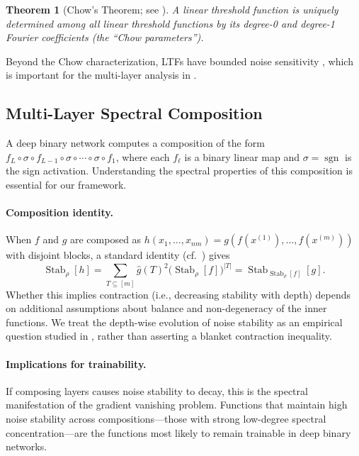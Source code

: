 \documentclass[12pt,a4paper]{article}
\theoremstyle{plain}
\newtheorem{theorem}{Theorem}[section]
\theoremstyle{definition}
\theoremstyle{remark}
\newcommand{\ghat}{\widehat{g}}
\newcommand{\sgn}{\operatorname{sgn}}
\newcommand{\Stab}{\operatorname{Stab}}
\begin{document}
\begin{theorem}[Chow's Theorem; see {\citet[Chapter~5]{odonnell2014analysis}}]\label{thm:chow}
A linear threshold function is uniquely determined among all linear threshold functions by its degree-0 and degree-1 Fourier coefficients (the ``Chow parameters'').
\end{theorem}

Beyond the Chow characterization, LTFs have bounded noise sensitivity \citep{harsha2014bounding}, which is important for the multi-layer analysis in .


\subsection{Multi-Layer Spectral Composition}\label{sec:multi-layer-background}

A deep binary network computes a composition of the form $f_L \circ \sigma \circ f_{L-1} \circ \sigma \circ \cdots \circ \sigma \circ f_1$, where each $f_\ell$ is a binary linear map and $\sigma = \sgn$ is the sign activation. Understanding the spectral properties of this composition is essential for our framework.

\paragraph{Composition identity.}
When $f$ and $g$ are composed as $h(x_1,\ldots,x_{nm}) = g(f(x^{(1)}),\ldots,f(x^{(m)}))$ with disjoint blocks, a standard identity (cf.\ {\citet[Chapter~9]{odonnell2014analysis}}) gives
\[
    \Stab_\rho[h] = \sum_{T \subseteq [m]} \ghat(T)^2 \bigl(\Stab_\rho[f]\bigr)^{|T|} = \Stab_{\Stab_\rho[f]}[g].
\]
Whether this implies contraction (i.e., decreasing stability with depth) depends on additional assumptions about balance and non-degeneracy of the inner functions. We treat the depth-wise evolution of noise stability as an empirical question studied in , rather than asserting a blanket contraction inequality.

\paragraph{Implications for trainability.}
If composing layers causes noise stability to decay, this is the spectral manifestation of the gradient vanishing problem. Functions that maintain high noise stability across compositions---those with strong low-degree spectral concentration---are the functions most likely to remain trainable in deep binary networks.
\end{document}
